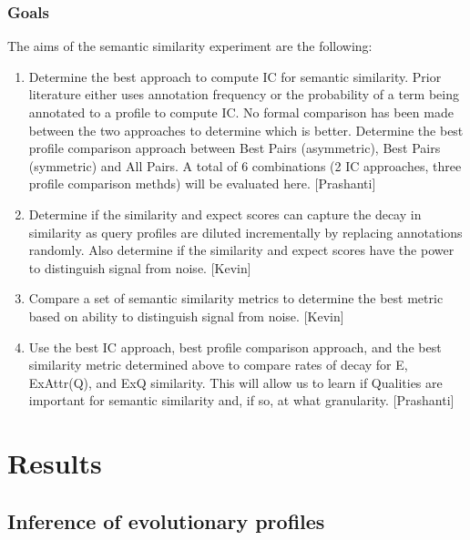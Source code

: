 \documentclass{article}
\begin{document}
\subsubsection{Goals}
The aims of the semantic similarity experiment are the following: 
\begin{enumerate}
\item Determine the best approach to compute IC for semantic similarity. Prior literature either uses annotation frequency or the probability of a term being annotated to a profile to compute IC. No formal comparison has been made between the two approaches to determine which is better. Determine the best profile comparison approach between Best Pairs (asymmetric), Best Pairs (symmetric) and All Pairs. A total of 6 combinations (2 IC approaches, three profile comparison methds) will be evaluated here. [Prashanti]
\item Determine if the similarity and expect scores can capture the decay in similarity as query profiles are diluted incrementally by replacing annotations randomly. Also determine if the similarity and expect scores have the power to distinguish signal from noise. [Kevin]
\item Compare a set of semantic similarity metrics to determine the best metric based on ability to distinguish signal from noise. [Kevin]
\item Use the best IC approach, best profile comparison approach, and the best similarity metric determined above  to compare rates of decay for E, ExAttr(Q), and ExQ similarity. This will allow us to learn if Qualities are important for semantic similarity and, if so, at what granularity. [Prashanti]
\end{enumerate}

\section{Results}
\subsection{Inference of evolutionary profiles}

\end{document}
